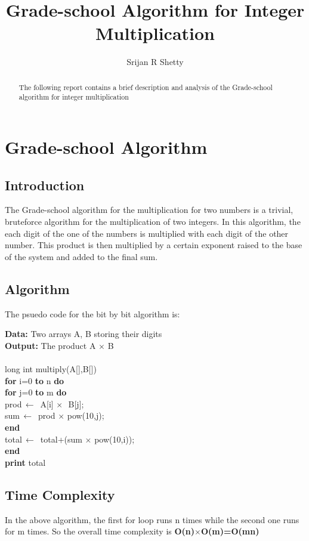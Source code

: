 \documentclass[12pt,a4paper,titlepage]{article}
\author{Srijan R Shetty}
\title{Grade-school Algorithm for Integer Multiplication}
\begin{document}
\maketitle

\begin{abstract}
The following report contains a brief description and analysis of the Grade-school algorithm for integer multiplication
\end{abstract}

\tableofcontents

\newpage

\section{Grade-school Algorithm}
\subsection{Introduction}
The Grade-school algorithm for the multiplication for two numbers is a trivial, bruteforce algorithm for the multiplication of two integers. In this algorithm, the each digit of the one of the numbers is multiplied with each digit of the other number. This product is then multiplied by a certain exponent raised to the base of the system and added to the final sum.

\subsection{Algorithm}
The psuedo code for the bit by bit algorithm is:\\

\begin{minipage}{3000pt}
\textbf{Data:} Two arrays A, B storing their digits\\
\textbf{Output:} The product A $\times$ B\\ 
\\long int multiply(A[],B[])\\
\hspace{1cm}\textbf{for} i=0 \textbf{to} n \textbf{do}\\
\hspace{2cm}\textbf{for} j=0 \textbf{to} m \textbf{do}\\
\hspace{3cm}prod$\,\leftarrow\,$ A[i]$\,\times\,$ B[j];\\
\hspace{3cm}sum$\,\leftarrow\,$ prod$\,\times\,$pow(10,j);\\
\hspace{2cm}\textbf{end}\\
\hspace{2cm}total$\,\leftarrow\,$ total+(sum$\,\times\,$pow(10,i));\\
\hspace{1cm}\textbf{end}\\
\textbf{print} total\\
\end{minipage}

\subsection{Time Complexity} 
In the above algorithm, the first for loop runs n times while the second one runs for m times. So the overall time complexity is \textbf{O(n)$\times$O(m)=O(mn)}
\end{document}

